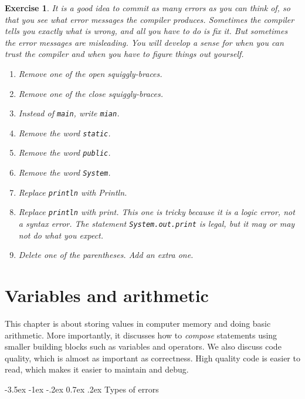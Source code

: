 \documentclass[12pt]{book}
\makeatletter
\theoremstyle{exercise}
\newtheorem{exercise}{Exercise}[chapter]
\newcommand{\java}[1]{\verb"#1"}
\renewcommand{\section}{\@startsection {section}{1}{\z@}%
    {-3.5ex \@plus -1ex \@minus -.2ex}%
    {0.7ex \@plus.2ex}%
    {\normalfont\Large\bfseries}}
\newcommand{\java}[1]{\lstinline{#1}} %
\makeatother
\begin{document}
\begin{exercise}

It is a good idea to commit as many errors as you can think of, so that you see what error messages the compiler produces.
Sometimes the compiler tells you exactly what is wrong, and all you have to do is fix it.
But sometimes the error messages are misleading.
You will develop a sense for when you can trust the compiler and when you have to figure things out yourself.

\begin {enumerate}
\item Remove one of the open squiggly-braces.
\item Remove one of the close squiggly-braces.
\item Instead of \java{main}, write \java{mian}.
\item Remove the word \java{static}.
\item Remove the word \java{public}.
\item Remove the word \java{System}.
\item Replace \java{println} with {Println}.
\item Replace \java{println} with {print}.
This one is tricky because it is a logic error, not a syntax error.
The statement \java{System.out.print} is legal, but it may or may not do what you expect.
\item Delete one of the parentheses.  Add an extra one.
\end {enumerate}

\end{exercise}


\chapter{Variables and arithmetic}

This chapter is about storing values in computer memory and doing basic arithmetic.
More importantly, it discusses how to {\em compose} statements using smaller building blocks such as variables and operators.
We also discuss code quality, which is almost as important as correctness.
High quality code is easier to read, which makes it easier to maintain and debug.



\section{Types of errors}
\end{document}
